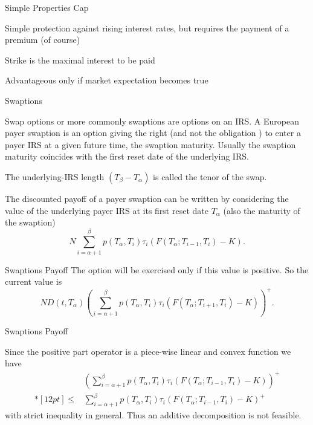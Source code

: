 {Simple Properties Cap}


	Simple protection against rising interest rates, but requires the payment of a premium (of course)

	Strike is the maximal interest to be paid

	Advantageous only if market expectation becomes true



{Swaptions}


	Swap options or more commonly swaptions are options on an IRS. A
European payer swaption is an option giving the right (and not the
obligation ) to enter a payer IRS at a given future time, the
swaption maturity. Usually the swaption maturity coincides with
the first reset date of the underlying IRS.

The underlying-IRS
length $(T_{\beta}-T_{\alpha})$ is called the tenor of the swap.

	The discounted payoff of a payer swaption can be written by
considering the value of the underlying payer IRS at its first
reset date $T_{\alpha}$ (also the maturity of the swaption)
$$
N\sum_{i=\alpha+1}^{\beta} p(T_{\alpha},T_i)\tau_i(F(T_{\alpha};T_{i-1},T_i)-K).
$$


{Swaptions Payoff}
The option will be exercised only if this
value is positive. So the current value is
$$
ND(t,T_{\alpha})\left(\sum_{i=\alpha+1}^{\beta}p(T_{\alpha},T_i)\tau_i
(F(T_{\alpha};T_{i+1},T_i)-K)\right)^+.
$$

{Swaptions Payoff}

Since the positive part operator is a
piece-wise linear and convex function we have
$$\begin{array}{ll}
&\displaystyle
\left(\sum_{i=\alpha+1}^{\beta}p(T_{\alpha},T_i)\tau_i(F(T_{\alpha};T_{i-1},T_i)-K)\right)^+\\*[12pt]
\leq&\displaystyle \sum_{i=\alpha+1}^{\beta}p(T_{\alpha},T_i)\tau_i(F(T_{\alpha};T_{i-1},T_i)-K)^+
\end{array}
$$
with strict inequality in general. Thus an additive decomposition is not
feasible.


